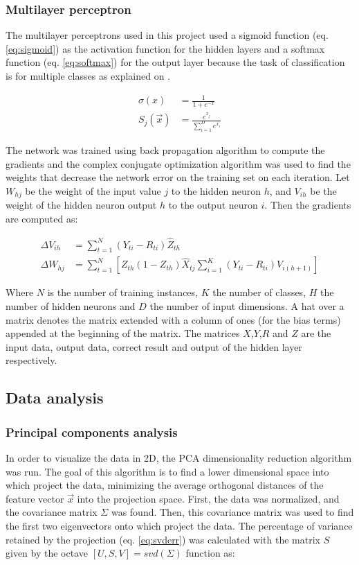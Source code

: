 \documentclass{IEEEtran}
\begin{document}
\subsubsection{Multilayer perceptron}
The multilayer perceptrons used in this project used a sigmoid function (eq. \ref{eq:sigmoid}) as the
activation function for the hidden layers and a softmax function (eq. \ref{eq:softmax}) for the output layer
because the task of classification is for multiple classes as explained on \cite{alpaydin2004}.

\begin{align}
\sigma(x) &= \frac{1}{1+e^{-x}} \label{eq:sigmoid} \\ 
S_j(\vec{x}) &= \frac{e^{x_j}}{\sum_{i=1}^D{e^{x_i}}} \label{eq:softmax}
\end{align}

The network was trained using back propagation algorithm to compute the gradients and the complex conjugate
optimization algorithm was used to find the weights that decrease the network error on the training set on
each iteration. Let $W_{hj}$ be the weight of the input value $j$ to the hidden neuron $h$, and $V_{ih}$ be
the weight of the hidden neuron output $h$ to the output neuron $i$. Then the gradients are computed as:

\begin{align}
\Delta V_{ih} &= \sum_{t=1}^{N}{(Y_{ti} - R_{ti}) \hat{Z}_{th}} \label{eq:gradV} \\ 
\Delta W_{hj} &= \sum_{t=1}^{N}{ 
    \left[ Z_{th}(1 - Z_{th})\hat{X}_{tj} \sum_{i=1}^{K}{ (Y_{ti} - R_{ti})V_{i(h+1)} } \right]
}  \label{eq:gradW}
\end{align}

Where $N$ is the number of training instances, $K$ the number of classes, $H$ the number of hidden neurons 
and $D$ the number of input dimensions. A hat over a matrix denotes the matrix extended with a column of
ones (for the bias terms) appended at the beginning of the matrix. The matrices $X$,$Y$,$R$ and $Z$ are
the input data, output data, correct result and output of the hidden layer respectively.

\subsection{Data analysis}

\subsubsection{Principal components analysis}
In order to visualize the data in 2D, the PCA dimensionality reduction algorithm was run.
The goal of this algorithm is to find a lower dimensional space into which project the data, minimizing
the average orthogonal distances of the feature vector $\vec{x}$ into the projection space. First, the data
was normalized, and the covariance matrix $\Sigma$ was found. Then, this covariance matrix was used to find the
first two eigenvectors onto which project the data. The percentage of variance retained by the projection 
(eq. \ref{eq:svderr}) was calculated with the matrix $S$ given by the octave $[U,S,V] = svd(\Sigma)$ function as:
\end{document}

